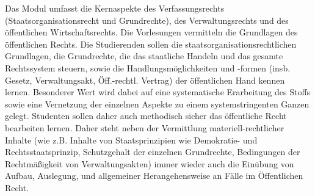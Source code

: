 \begin{module}
\begin{content}
Das Modul umfasst die Kernaspekte des Verfassungsrechts (Staatsorganisationsrecht und Grundrechte), des Verwaltungsrechts und des öffentlichen Wirtschaftsrechts. Die Vorlesungen vermitteln die Grundlagen des öffentlichen Rechts. Die Studierenden sollen die staatsorganisationsrechtlichen Grundlagen, die Grundrechte, die das staatliche Handeln und das gesamte Rechtssystem steuern, sowie die Handlungsmöglichkeiten und -formen (insb. Gesetz, Verwaltungsakt, Öff.-rechtl. Vertrag) der öffentlichen Hand kennen lernen. Besonderer Wert wird dabei auf eine systematische Erarbeitung des Stoffs sowie eine Vernetzung der einzelnen Aspekte zu einem systemstringenten Ganzen gelegt. Studenten sollen daher auch methodisch sicher das öffentliche Recht bearbeiten lernen. Daher steht neben der Vermittlung materiell-rechtlicher Inhalte (wie z.B. Inhalte von Staatsprinzipien wie Demokratie- und Rechtsstaatsprinzip, Schutzgehalt der einzelnen Grundrechte, Bedingungen der Rechtmäßigkeit von Verwaltungsakten) immer wieder auch die Einübung von Aufbau, Auslegung, und allgemeiner Herangehensweise an Fälle im Öffentlichen Recht.


\end{content}



\end{module}


